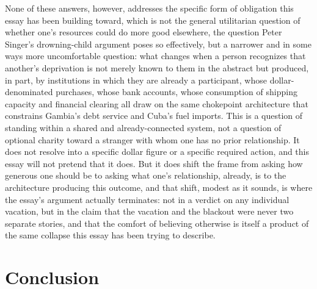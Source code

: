\documentclass[11pt]{article}
\begin{document}
None of these answers, however, addresses the specific form of obligation this essay has been building toward, which is not the general utilitarian question of whether one's resources could do more good elsewhere, the question Peter Singer's drowning-child argument poses so effectively, but a narrower and in some ways more uncomfortable question: what changes when a person recognizes that another's deprivation is not merely known to them in the abstract but produced, in part, by institutions in which they are already a participant, whose dollar-denominated purchases, whose bank accounts, whose consumption of shipping capacity and financial clearing all draw on the same chokepoint architecture that constrains Gambia's debt service and Cuba's fuel imports. This is a question of standing within a shared and already-connected system, not a question of optional charity toward a stranger with whom one has no prior relationship. It does not resolve into a specific dollar figure or a specific required action, and this essay will not pretend that it does. But it does shift the frame from asking how generous one should be to asking what one's relationship, already, is to the architecture producing this outcome, and that shift, modest as it sounds, is where the essay's argument actually terminates: not in a verdict on any individual vacation, but in the claim that the vacation and the blackout were never two separate stories, and that the comfort of believing otherwise is itself a product of the same collapse this essay has been trying to describe.

\section{Conclusion}
\end{document}
